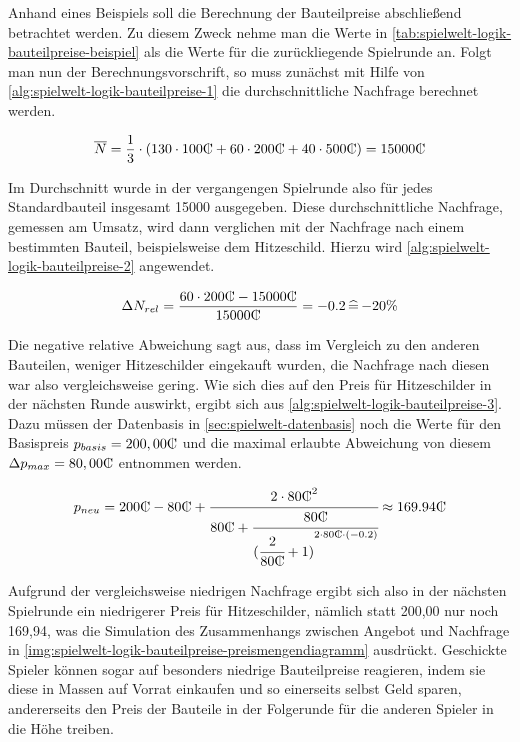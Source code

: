 Anhand eines Beispiels soll die Berechnung der Bauteilpreise abschließend betrachtet werden. Zu diesem Zweck nehme man die Werte in \ref{tab:spielwelt-logik-bauteilpreise-beispiel} als die Werte für die zurückliegende Spielrunde an. Folgt man nun der Berechnungsvorschrift, so muss zunächst mit Hilfe von \ref{alg:spielwelt-logik-bauteilpreise-1} die durchschnittliche Nachfrage berechnet werden.

\newcommand{\tc}{\text{\curr}}
\begin{equation}
     \overline{N} = \frac{1}{3} \cdot {(130 \cdot 100 \tc + 60 \cdot 200 \tc + 40 \cdot 500 \tc)} = 15000 \tc \nonumber
\end{equation}

Im Durchschnitt wurde in der vergangengen Spielrunde also für jedes Standardbauteil insgesamt 15000\curr{} ausgegeben. Diese durchschnittliche Nachfrage, gemessen am Umsatz, wird dann verglichen mit der Nachfrage nach einem bestimmten Bauteil, beispielsweise dem Hitzeschild. Hierzu wird \ref{alg:spielwelt-logik-bauteilpreise-2} angewendet.

\begin{equation}
     \Delta{}N_{rel} = \frac{60 \cdot 200 \tc - 15000 \tc}{15000 \tc} = -0.2 \mathop{\widehat{=}} -20\% \nonumber
\end{equation}

Die negative relative Abweichung sagt aus, dass im Vergleich zu den anderen Bauteilen, weniger Hitzeschilder eingekauft wurden, die Nachfrage nach diesen war also vergleichsweise gering. Wie sich dies auf den Preis für Hitzeschilder in der nächsten Runde auswirkt, ergibt sich aus \ref{alg:spielwelt-logik-bauteilpreise-3}. Dazu müssen der Datenbasis in \ref{sec:spielwelt-datenbasis} noch die Werte für den Basispreis $p_{basis} = 200,00\tc$ und die maximal erlaubte Abweichung von diesem $\Delta{}p_{max} = 80,00\tc$ entnommen werden.

\begin{large}
\begin{equation}
     p_{neu} = 200 \tc -80 \tc + \cfrac{2 \cdot 80 \tc^2}{80 \tc + \cfrac{80 \tc}{({\cfrac{2}{80 \tc} + 1)}^{2 \cdot 80 \tc \cdot (-0.2)}}} \approx 169.94 \tc \nonumber
\end{equation}
\end{large}

Aufgrund der vergleichsweise niedrigen Nachfrage ergibt sich also in der nächsten Spielrunde ein niedrigerer Preis für Hitzeschilder, nämlich statt 200,00\curr{} nur noch 169,94\curr{}, was die Simulation des Zusammenhangs zwischen Angebot und Nachfrage in \ref{img:spielwelt-logik-bauteilpreise-preismengendiagramm} ausdrückt. Geschickte Spieler können sogar auf besonders niedrige Bauteilpreise reagieren, indem sie diese in Massen auf Vorrat einkaufen und so einerseits selbst Geld sparen, andererseits den Preis der Bauteile in der Folgerunde für die anderen Spieler in die Höhe treiben.
